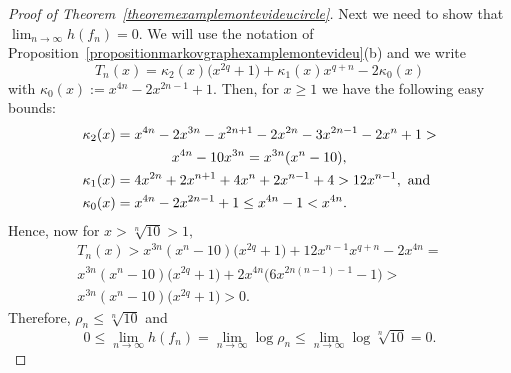 \documentclass[a4paper, 11pt]{amsart}
\numberwithin{equation}{section}
\theoremstyle{customnumberedtheorem}
\theoremstyle{definitionwithbfnote}
\begin{document}
\begin{proof}[Proof of Theorem~\ref{theoremexamplemontevideucircle}]
Next we need to show that $\lim_{n\to\infty} h(f_n) = 0.$
We will use the notation of
Proposition~\ref{propositionmarkovgraphexamplemontevideu}(b)
and we write
\[
    T_n(x)  = \kappa_2(x)\bigl(x^{2q} + 1\bigr) + \kappa_1(x)x^{q+n} - 2\kappa_0(x)
\]
with $\kappa_0(x) := x^{4n} - 2x^{2n-1} + 1.$
Then, for $x \ge 1$ we have the following easy bounds:
\begin{align*}
 \kappa_2(x) &=  x^{4n} - 2x^{3n} - x^{2n+1} - 2x^{2n} - 3x^{2n-1} - 2x^{n} + 1 >\\
             &\hspace*{4em}x^{4n} - 10x^{3n} = x^{3n} (x^n - 10),\\
 \kappa_1(x) &= 4x^{2n} + 2x^{n+1} + 4x^{n} + 2x^{n-1} + 4 > 12x^{n-1},\text{ and}\\
 \kappa_0(x) &= x^{4n} - 2x^{2n-1} + 1 \le x^{4n} - 1 < x^{4n}.
\end{align*}
Hence, now for $x > \sqrt[n]{10} > 1,$
\begin{multline*}
 T_n(x) > x^{3n} (x^n - 10)\bigl(x^{2q} + 1\bigr) + 12x^{n-1}x^{q+n} - 2x^{4n} = \\
          x^{3n} (x^n - 10)\bigl(x^{2q} + 1\bigr) + 2x^{4n} \bigl(6x^{2n(n-1)-1} - 1\bigr) > \\
          x^{3n} (x^n - 10)\bigl(x^{2q} + 1\bigr) > 0.
\end{multline*}
Therefore, $\rho_n \le \sqrt[n]{10}$ and
\[ 0 \le \lim_{n\to\infty} h(f_n) = \lim_{n\to\infty} \log \rho_n \le \lim_{n\to\infty} \log \sqrt[n]{10} = 0. \]
\end{proof}
\end{document}

